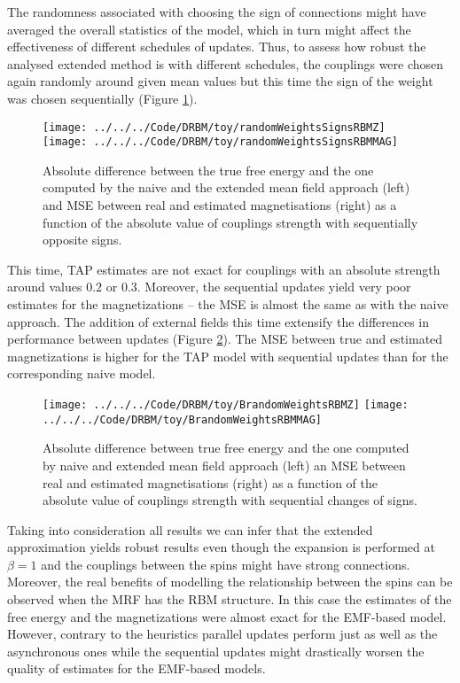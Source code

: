 The randomness associated with choosing the sign of connections might have averaged the overall statistics of the model, which in turn might affect the effectiveness of different schedules of updates. Thus, to assess how robust the analysed extended method is with different schedules, the couplings were chosen again randomly around given mean values but this time the sign of the weight was chosen sequentially (Figure \ref{fig:signs}).
\begin{figure}[!htb]
%
 \texttt{[image: ../../../Code/DRBM/toy/randomWeightsSignsRBMZ]}
\endminipage 
{}  
\texttt{[image: ../../../Code/DRBM/toy/randomWeightsSignsRBMMAG]}
\endminipage\hfill
  \caption[1]{Absolute difference between the true free energy and the one computed by the naive and the extended mean field approach (left) and MSE between real and estimated magnetisations (right) as a function of the absolute value of couplings strength with sequentially opposite signs.}
  \label{fig:signs}
\end{figure}

This time, TAP estimates are not exact for couplings with an absolute strength around values $0.2$ or $0.3$. Moreover, the sequential updates yield very poor estimates for the magnetizations -- the MSE is almost the same as with the naive approach. The addition of external fields this time extensify the differences in performance between updates (Figure \ref{fig:bias}). The MSE between true and estimated magnetizations is higher for the TAP model with sequential updates than for the corresponding naive model.

\begin{figure}[!htb]
%
 \texttt{[image: ../../../Code/DRBM/toy/BrandomWeightsRBMZ]}
\endminipage 
{}  
\texttt{[image: ../../../Code/DRBM/toy/BrandomWeightsRBMMAG]}
\endminipage\hfill
  \caption[1]{Absolute difference between true free energy and the one computed by naive and extended mean field approach (left) an MSE between real and estimated magnetisations (right) as a function of the absolute value of couplings strength with sequential changes of signs.}
  \label{fig:bias}
\end{figure}

Taking into consideration all results we can infer that the extended approximation yields robust results even though the expansion is performed at $\beta = 1$ and the couplings between the spins might have strong connections. Moreover, the real benefits of modelling the relationship between the spins can be observed when the MRF has the RBM structure. In this case the estimates of the free energy and the magnetizations were almost exact for the EMF-based model. However, contrary to the heuristics parallel updates perform just as well as the asynchronous ones while the sequential updates might drastically worsen the quality of estimates for the EMF-based models.

